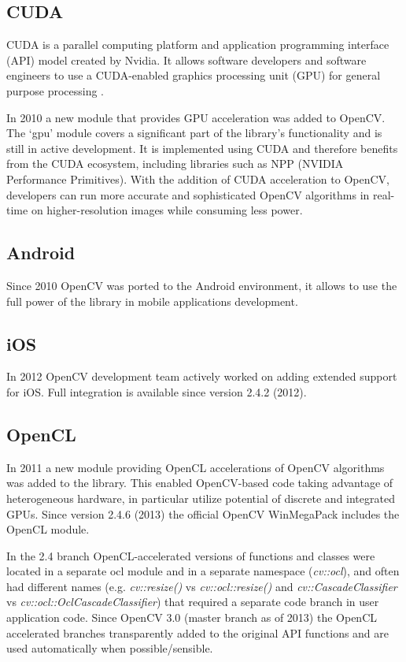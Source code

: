 \documentclass[9pt,twocolumn,twoside]{../../styles/osajnl}
\begin{document}
\subsection{CUDA}

CUDA is a parallel computing platform and application programming interface (API) model created by Nvidia. It allows software developers and software engineers to use a CUDA-enabled graphics processing unit (GPU) for general purpose processing \cite{www-cuda-wiki}. 

In 2010 a new module that provides GPU acceleration was added to OpenCV. The ‘gpu’ module covers a significant part of the library’s functionality and is still in active development. It is implemented using CUDA and therefore benefits from the CUDA ecosystem, including libraries such as NPP (NVIDIA Performance Primitives). With the addition of CUDA acceleration to OpenCV, developers can run more accurate and sophisticated OpenCV algorithms in real-time on higher-resolution images while consuming less power.

\subsection{Android}
Since 2010 OpenCV was ported to the Android environment, it allows to use the full power of the library in mobile applications development.
\subsection{iOS}
In 2012 OpenCV development team actively worked on adding extended support for iOS. Full integration is available since version 2.4.2 (2012).

\subsection{OpenCL}
In 2011 a new module providing OpenCL accelerations of OpenCV algorithms was added to the library. This enabled OpenCV-based code taking advantage of heterogeneous hardware, in particular utilize potential of discrete and integrated GPUs. Since version 2.4.6 (2013) the official OpenCV WinMegaPack includes the OpenCL module.

In the 2.4 branch OpenCL-accelerated versions of functions and classes were located in a separate ocl module and in a separate namespace (\textit{cv::ocl}), and often had different names (e.g. \textit{cv::resize()} vs \textit{cv::ocl::resize()} and \textit{cv::CascadeClassifier} vs \textit{cv::ocl::OclCascadeClassifier}) that required a separate code branch in user application code. Since OpenCV 3.0 (master branch as of 2013) the OpenCL accelerated branches transparently added to the original API functions and are used automatically when possible/sensible.
\end{document}
